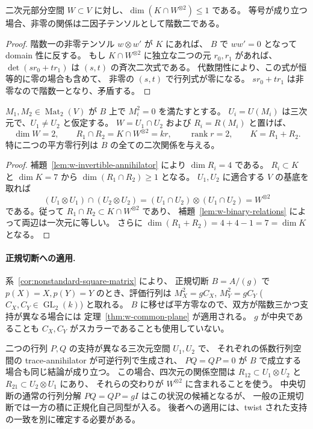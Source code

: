 \begin{lemma}[二次元部分空間にある関係]
\label{lem:w-binary-relations}
二次元部分空間 $W\subset V$ に対し、$\dim(K\cap W^{\otimes2})\le1$ である。
等号が成り立つ場合、非零の関係は二因子テンソルとして階数二である。
\end{lemma}
\begin{proof}
階数一の非零テンソル $w\otimes w'$ が $K$ にあれば、
$B$ で $ww'=0$ となって domain 性に反する。
もし $K\cap W^{\otimes2}$ に独立な二つの元 $r_0,r_1$ があれば、
$\det(sr_0+tr_1)$ は $(s,t)$ の斉次二次式である。
代数閉性により、この式が恒等的に零の場合も含めて、
非零の $(s,t)$ で行列式が零になる。
$sr_0+tr_1$ は非零なので階数一となり、矛盾する。
\end{proof}

\begin{theorem}
\label{thm:w-common-plane}
$M_1,M_2\in\operatorname{Mat}_2(V)$ が $B$ 上で $M_i^2=0$ を満たすとする。
$U_i=U(M_i)$ は三次元で、$U_1\ne U_2$ と仮定する。
$W=U_1\cap U_2$ および $R_i=R(M_i)$ と置けば、
\[
 \dim W=2,\qquad
 R_1\cap R_2=K\cap W^{\otimes2}=kr,\qquad
 \operatorname{rank} r=2,\qquad K=R_1+R_2.
\]
特に二つの平方零行列は $B$ の全ての二次関係を与える。
\end{theorem}
\begin{proof}
補題~\ref{lem:w-invertible-annihilator} により $\dim R_i=4$ である。
$R_i\subset K$ と $\dim K=7$ から $\dim(R_1\cap R_2)\ge1$ となる。
$U_1,U_2$ に適合する $V$ の基底を取れば
\[
 (U_1\otimes U_1)\cap(U_2\otimes U_2)
   =(U_1\cap U_2)\otimes(U_1\cap U_2)=W^{\otimes2}
\]
である。従って $R_1\cap R_2\subset K\cap W^{\otimes2}$ であり、
補題~\ref{lem:w-binary-relations} によって両辺は一次元に等しい。
さらに $\dim(R_1+R_2)=4+4-1=7=\dim K$ となる。
\end{proof}

\paragraph{正規切断への適用.}
系~\ref{cor:nonstandard-square-matrix} により、
正規切断 $B=A/(g)$ で $p(X)=X,p(Y)=Y$ のとき、評価行列は
$M_X^2=gC_X$, $M_Y^2=gC_Y$ ($C_X,C_Y\in\operatorname{GL}_2(k)$) と取れる。
$B$ に移せば平方零なので、双方が階数三かつ支持が異なる場合には
定理~\ref{thm:w-common-plane} が適用される。
$g$ が中央であることも $C_X,C_Y$ がスカラーであることも使用していない。

\begin{remark}[交差積の場合にも使える部分]
\label{rem:w-crossed-products}
二つの行列 $P,Q$ の支持が異なる三次元空間 $U_1,U_2$ で、
それぞれの係数行列空間の trace-annihilator が可逆行列で生成され、
$PQ=QP=0$ が $B$ で成立する場合も同じ結論が成り立つ。
この場合、四次元の関係空間は
$R_{12}\subset U_1\otimes U_2$ と $R_{21}\subset U_2\otimes U_1$ にあり、
それらの交わりが $W^{\otimes2}$ に含まれることを使う。
中央切断の通常の行列分解 $PQ=QP=gI$ はこの状況の候補となるが、
一般の正規切断では一方の積に正規化自己同型が入る。
後者への適用には、twist された支持の一致を別に確定する必要がある。
\end{remark}

